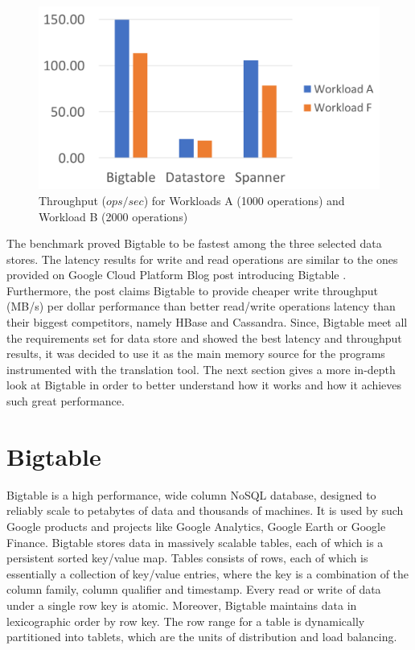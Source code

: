 \documentclass[bsc,frontabs,twoside,singlespacing,parskip,deptreport]{infthesis}     %
\begin{document}
\begin{figure}[H]
	\centering
	\includegraphics[width=12cm]{throughput}
	\caption{Throughput (\(ops/sec\)) for Workloads A (1000 operations) and Workload B (2000 operations)}
	\label{throughput}
\end{figure}

The benchmark proved Bigtable to be fastest among the three selected data stores. The latency results for write and read operations are similar to the ones provided on Google Cloud Platform Blog post introducing Bigtable \citep{bigtable-introduction}. Furthermore, the post claims Bigtable to provide cheaper write throughput (MB/s) per dollar performance than better read/write operations latency than their biggest competitors, namely HBase and Cassandra. Since, Bigtable meet all the requirements set for data store and showed the best latency and throughput results, it was decided to use it as the main memory source for the programs instrumented with the translation tool. The next section gives a more in-depth look at Bigtable in order to better understand how it works and how it achieves such great performance.

\section{Bigtable}

Bigtable \citep{google-bigtable} is a high performance, wide column NoSQL database, designed to reliably scale to petabytes of data and thousands of machines. It is used by such Google products and projects like Google Analytics, Google Earth or Google Finance. Bigtable stores data in massively scalable tables, each of which is a persistent sorted key/value map. Tables consists of rows, each of which is essentially a collection of key/value entries, where the key is a combination of the column family, column qualifier and timestamp. Every read or write of data under a single row key is atomic. Moreover, Bigtable maintains data in lexicographic order by row key. The row range for a table is dynamically partitioned into tablets, which are the units of distribution and load balancing.
\end{document}
